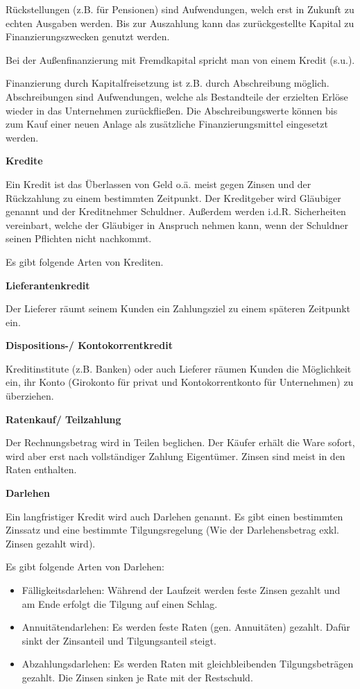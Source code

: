 Rückstellungen (z.B. für Pensionen) sind Aufwendungen, welch erst in Zukunft zu echten Ausgaben werden. Bis zur Auszahlung kann das zurückgestellte Kapital zu Finanzierungszwecken genutzt werden.

Bei der Außenfinanzierung mit Fremdkapital spricht man von einem Kredit (s.u.).

Finanzierung durch Kapitalfreisetzung ist z.B. durch Abschreibung möglich. Abschreibungen sind Aufwendungen, welche als Bestandteile der erzielten Erlöse wieder in das Unternehmen zurückfließen. Die Abschreibungswerte können bis zum Kauf einer neuen Anlage als zusätzliche Finanzierungsmittel eingesetzt werden.

\textbf{Kredite}

Ein Kredit ist das Überlassen von Geld o.ä. meist gegen Zinsen und der Rückzahlung zu einem bestimmten Zeitpunkt. Der Kreditgeber wird Gläubiger genannt und der Kreditnehmer Schuldner. Außerdem werden i.d.R. Sicherheiten vereinbart, welche der Gläubiger in Anspruch nehmen kann, wenn der Schuldner seinen Pflichten nicht nachkommt.

Es gibt folgende Arten von Krediten.

\textbf{Lieferantenkredit}

Der Lieferer räumt seinem Kunden ein Zahlungsziel zu einem späteren Zeitpunkt ein.

\textbf{Dispositions-/ Kontokorrentkredit}

Kreditinstitute (z.B. Banken) oder auch Lieferer räumen Kunden die Möglichkeit ein, ihr Konto (Girokonto für privat und Kontokorrentkonto für Unternehmen) zu überziehen.

\textbf{Ratenkauf/ Teilzahlung}

Der Rechnungsbetrag wird in Teilen beglichen. Der Käufer erhält die Ware sofort, wird aber erst nach vollständiger Zahlung Eigentümer. Zinsen sind meist in den Raten enthalten.

\textbf{Darlehen}

Ein langfristiger Kredit wird auch Darlehen genannt. Es gibt einen bestimmten Zinssatz und eine bestimmte Tilgungsregelung (Wie der Darlehensbetrag exkl. Zinsen gezahlt wird).

Es gibt folgende Arten von Darlehen:

\begin{itemize}
    \item Fälligkeitsdarlehen: Während der Laufzeit werden feste Zinsen gezahlt und am Ende erfolgt die Tilgung auf einen Schlag.
    \item Annuitätendarlehen: Es werden feste Raten (gen. Annuitäten) gezahlt. Dafür sinkt der Zinsanteil und Tilgungsanteil steigt.
    \item Abzahlungsdarlehen: Es werden Raten mit gleichbleibenden Tilgungsbeträgen gezahlt. Die Zinsen sinken je Rate mit der Restschuld.
\end{itemize}

